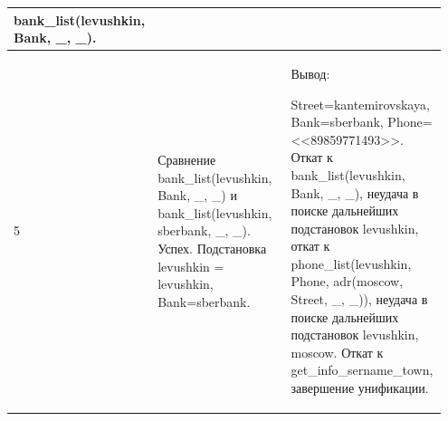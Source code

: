 \documentclass[a4paper,12pt]{article}
\begin{document}
\begin{table} [h!]
\begin{center}
\begin{tabular}{|p{0.05\linewidth}|p{0.5\linewidth}|p{0.4\linewidth}|}
{					bank\_list(levushkin, Bank, \_, \_).}\\
				\hline
				{5} & {Сравнение bank\_list(levushkin, Bank, \_, \_) и bank\_list(levushkin, sberbank, \_, \_). Успех. Подстановка levushkin = levushkin, Bank=sberbank.} & {Вывод:
					
					Street=kantemirovskaya, Bank=sberbank, Phone=<<89859771493>>. Откат к bank\_list(levushkin, Bank, \_, \_), неудача в поиске дальнейших подстановок levushkin, откат к phone\_list(levushkin, Phone, adr(moscow, Street, \_, \_)), неудача в поиске дальнейших подстановок levushkin, moscow. Откат к get\_info\_sername\_town, завершение унификации.}\\
				\hline
			\end{tabular}  
			\label{m6}
		\end{center}
	\end{table}
	
	
	
	
\end{document}
